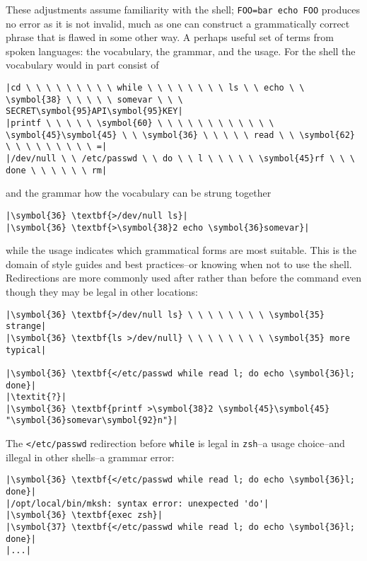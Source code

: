 \documentclass[10pt,a4paper]{article}
\begin{document}
These adjustments assume familiarity with the shell; \texttt{FOO=bar
echo FOO} produces no error as it is not invalid, much as one
can construct a grammatically correct phrase that is flawed in some
other way. A perhaps useful set of terms from spoken languages: the
vocabulary, the grammar, and the usage. For the shell the vocabulary
would in part consist of

\begin{lstlisting}
|cd \ \ \ \ \ \ \ \ \ while \ \ \ \ \ \ \ \ ls \ \ echo \ \ \symbol{38} \ \ \ \ \ somevar \ \ \ SECRET\symbol{95}API\symbol{95}KEY|
|printf \ \ \ \ \ \symbol{60} \ \ \ \ \ \ \ \ \ \ \ \ \symbol{45}\symbol{45} \ \ \symbol{36} \ \ \ \ \ read \ \ \symbol{62} \ \ \ \ \ \ \ \ \ =|
|/dev/null \ \ /etc/passwd \ \ do \ \ l \ \ \ \ \ \symbol{45}rf \ \ \ done \ \ \ \ \ \ rm|
\end{lstlisting}

and the grammar how the vocabulary can be strung together

\begin{lstlisting}
|\symbol{36} \textbf{>/dev/null ls}|
|\symbol{36} \textbf{>\symbol{38}2 echo \symbol{36}somevar}|
\end{lstlisting}

while the usage indicates which grammatical forms are most suitable.
This is the domain of style guides and best practices--or knowing when
not to use the shell. Redirections are more commonly used after rather
than before the command even though they may be legal in other
locations:

\begin{lstlisting}
|\symbol{36} \textbf{>/dev/null ls} \ \ \ \ \ \ \ \ \symbol{35} strange|
|\symbol{36} \textbf{ls >/dev/null} \ \ \ \ \ \ \ \ \symbol{35} more typical|

|\symbol{36} \textbf{</etc/passwd while read l; do echo \symbol{36}l; done}|
|\textit{?}|
|\symbol{36} \textbf{printf >\symbol{38}2 \symbol{45}\symbol{45} "\symbol{36}somevar\symbol{92}n"}|
\end{lstlisting}

The \texttt{</etc/passwd} redirection before \texttt{while} is
legal in \texttt{zsh}--a usage choice--and illegal in other shells--a
grammar error:

\begin{lstlisting}
|\symbol{36} \textbf{</etc/passwd while read l; do echo \symbol{36}l; done}|
|/opt/local/bin/mksh: syntax error: unexpected 'do'|
|\symbol{36} \textbf{exec zsh}|
|\symbol{37} \textbf{</etc/passwd while read l; do echo \symbol{36}l; done}|
|...|
\end{lstlisting}
\end{document}
